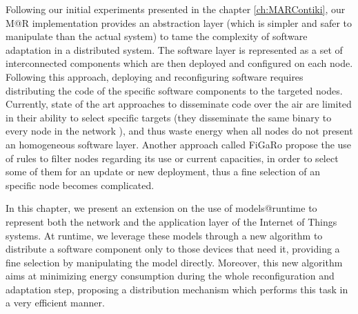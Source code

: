 Following our initial experiments presented in the chapter \ref{ch:MARContiki}, our M@R implementation provides an abstraction layer (which is simpler and safer to manipulate than the actual system) to tame the complexity of software adaptation in a distributed system. 
The software layer is represented as a set of interconnected components which are then deployed and configured on each node.
Following this approach, deploying and reconfiguring software requires distributing the code of the specific software components to the targeted nodes.
Currently, state of the art approaches to disseminate code over the air are limited in their ability to select specific targets (they disseminate the same binary to every node in the network \cite{hui2004dynamic}), and thus waste energy when all nodes do not present an homogeneous software layer.
Another approach called FiGaRo \cite{mottola2008figaro} propose the use of rules to filter nodes regarding its use or current capacities, in order to select some of them for an update or new deployment, thus a fine selection of an specific node becomes complicated.

In this chapter, we present an extension on the use of models@runtime to represent both the network and the application layer of the Internet of Things systems.
At runtime, we leverage these models through a new algorithm to distribute a software component only to those devices that need it, providing a fine selection by manipulating the model directly.
Moreover, this new algorithm aims at minimizing energy consumption during the whole reconfiguration and adaptation step, proposing a distribution mechanism which performs this task in a very efficient manner.


